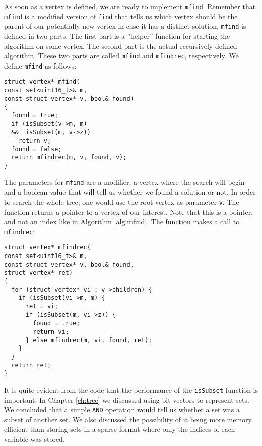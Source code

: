 As soon as a vertex is defined, we are ready to implement \texttt{mfind}.
Remember that \texttt{mfind} is a modified version of \texttt{find} that tells
us which vertex should be the parent of our potentially new vertex in case it
has a distinct solution.
\texttt{mfind} is defined in two parts. The first part is a ''helper'' function
for starting the algorithm on some vertex. The second part is the actual
recursively defined algorithm. These two parts are called \texttt{mfind} and
\texttt{mfindrec}, respectively. We define \texttt{mfind} as follows:
\begin{verbatim}
struct vertex* mfind(
const set<uint16_t>& m,
const struct vertex* v, bool& found)
{
  found = true;
  if (isSubset(v->m, m)
  &&  isSubset(m, v->z))
    return v;
  found = false;
  return mfindrec(m, v, found, v);
}
\end{verbatim}
The parameters for \texttt{mfind} are a modifier, a vertex where the search
will begin and a boolean value that will tell us whether we found a
solution or not.
In order to search the whole tree, one would use the root vertex as parameter
\texttt{v}. The function returns a pointer to a vertex of our interest.
Note that this is a pointer, and not an index like in Algorithm
\ref{alg:mfind}. The function makes a call to \texttt{mfindrec}:
\begin{verbatim}
struct vertex* mfindrec(
const set<uint16_t>& m,
const struct vertex* v, bool& found,
struct vertex* ret)
{
  for (struct vertex* vi : v->children) {
    if (isSubset(vi->m, m) {
      ret = vi;
      if (isSubset(m, vi->z)) {
        found = true;
        return vi;
      } else mfindrec(m, vi, found, ret);
    }
  }
  return ret;
}
\end{verbatim}
It is quite evident from the code that the performance of the \texttt{isSubset}
function is important. In Chapter \ref{ch:tree} we discussed using bit vectors 
to represent sets. We concluded that a simple \texttt{AND} operation would tell
us whether a set was a subset of another set.
We also discussed the possibility of it being more memory efficient than
storing sets in a sparse format where only the indices of each variable was
stored.


